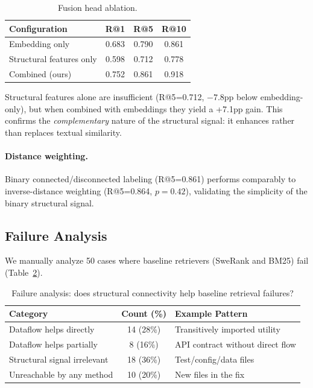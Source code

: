 \documentclass[11pt]{article}
\begin{document}
\begin{table}[h]
\centering
\caption{Fusion head ablation.}
\label{tab:fusion}
\small
\begin{tabular}{lccc}
\toprule
\textbf{Configuration} & \textbf{R@1} & \textbf{R@5} & \textbf{R@10} \\
\midrule
Embedding only          & 0.683 & 0.790 & 0.861 \\
Structural features only & 0.598 & 0.712 & 0.778 \\
Combined (ours)         & 0.752 & 0.861 & 0.918 \\
\bottomrule
\end{tabular}
\end{table}

Structural features alone are insufficient (R@5{=}0.712, $-7.8$pp below embedding-only), but when combined with embeddings they yield a +7.1pp gain.
This confirms the \emph{complementary} nature of the structural signal: it enhances rather than replaces textual similarity.

\paragraph{Distance weighting.}
Binary connected/disconnected labeling (R@5{=}0.861) performs comparably to inverse-distance weighting (R@5{=}0.864, $p{=}0.42$), validating the simplicity of the binary structural signal.

\subsection{Failure Analysis}

We manually analyze 50 cases where baseline retrievers (SweRank and BM25) fail (Table~\ref{tab:failure}).

\begin{table}[h]
\centering
\caption{Failure analysis: does structural connectivity help baseline retrieval failures?}
\label{tab:failure}
\small
\begin{tabular}{lcl}
\toprule
\textbf{Category} & \textbf{Count (\%)} & \textbf{Example Pattern} \\
\midrule
Dataflow helps directly    & 14 (28\%) & Transitively imported utility \\
Dataflow helps partially   &  8 (16\%) & API contract without direct flow \\
Structural signal irrelevant & 18 (36\%) & Test/config/data files \\
Unreachable by any method  & 10 (20\%) & New files in the fix \\
\bottomrule
\end{tabular}
\end{table}
\end{document}
